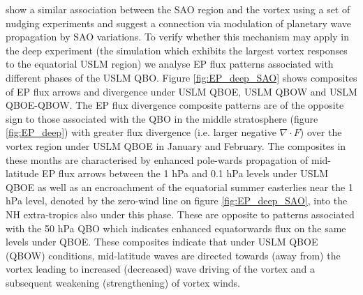 \cite{grayForecasting2020a} show a similar association between the SAO region and the vortex using a set of nudging experiments and suggest a connection via modulation of planetary wave propagation by SAO variations. To verify whether this mechanism may apply in the deep experiment (the simulation which exhibits the largest vortex responses to the equatorial USLM region) we analyse EP flux patterns associated with  different phases of the USLM QBO. Figure \ref{fig:EP_deep_SAO} shows composites of EP flux arrows and divergence under USLM QBOE, USLM QBOW and USLM QBOE-QBOW. The EP flux divergence composite patterns are of the opposite sign to those associated with the QBO in the middle stratosphere (figure \ref{fig:EP_deep}) with greater flux divergence (i.e. larger negative $\nabla \cdot F$) over the vortex region under USLM QBOE in January and February. The composites in these months are characterised by enhanced pole-wards propagation of mid-latitude EP flux arrows between the 1 hPa and 0.1 hPa levels under USLM QBOE as well as an encroachment of the equatorial summer easterlies near the 1 hPa level, denoted by the zero-wind line on figure \ref{fig:EP_deep_SAO}, into the NH extra-tropics also under this phase. These are opposite to patterns associated with the 50 hPa QBO which indicates enhanced equatorwards flux on the same levels under QBOE. These composites indicate that under USLM QBOE (QBOW) conditions, mid-latitude waves are directed towards (away from) the vortex leading to increased (decreased) wave driving of the vortex and a subsequent weakening (strengthening) of vortex winds.


